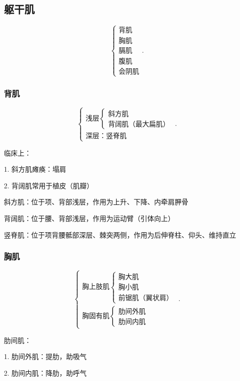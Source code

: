 \subsection{躯干肌}%
\label{sub:躯干肌}
\[
    \begin{cases}
        \text{背肌}\\
        \text{胸肌}\\
        \text{膈肌}\\
        \text{腹肌}\\
        \text{会阴肌}
    \end{cases}
.\] 
\subsubsection{背肌}%
\label{subsub:背肌}
\[
    \begin{cases}
        \text{浅层}\begin{cases}
            \text{斜方肌}\\
            \text{背阔肌（最大扁肌）}
        \end{cases}\\
        \text{深层：竖脊肌}
    \end{cases}
.\] 
\begin{notation}
    临床上：

    1. 斜方肌瘫痪：塌肩

    2. 背阔肌常用于植皮（肌瓣）
\end{notation}
斜方肌：位于项、背部浅层，作用为上升、下降、内牵肩胛骨

背阔肌：位于腰、背部浅层，作用为运动臂（引体向上）

竖脊肌：位于项背腰骶部深层、棘突两侧，作用为后伸脊柱、仰头、维持直立
\subsubsection{胸肌}%
\label{subsub:胸肌}
\[
    \begin{cases}
        \text{胸上肢肌}\begin{cases}
            \text{胸大肌}\\
            \text{胸小肌}\\
            \text{前锯肌（翼状肩）}
        \end{cases}\\
        \text{胸固有肌}\begin{cases}
            \text{肋间外肌}\\
            \text{肋间内肌}
        \end{cases}
    \end{cases}
.\] 
\begin{notation}
    肋间肌：

    1. 肋间外肌：提肋，助吸气

    2. 肋间内肌：降肋，助呼气
\end{notation}

